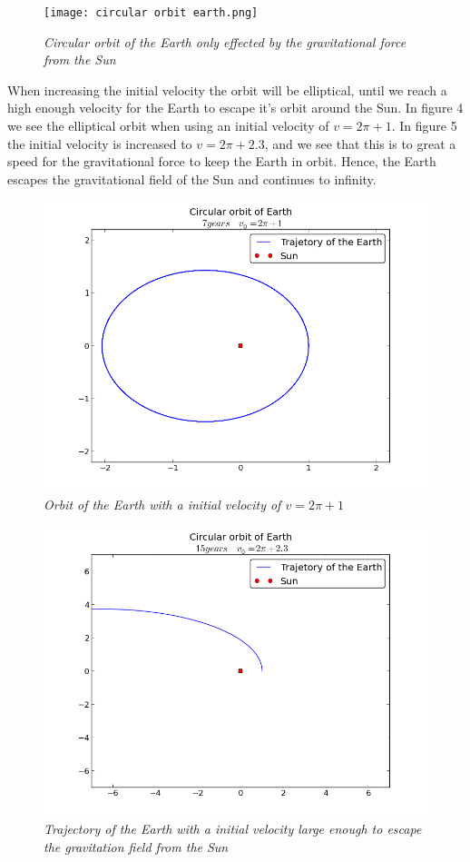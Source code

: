 \documentclass[a4paper,12pt, english]{article}
\begin{document}
\begin{figure}[h!]
  \centering
    \texttt{[image: circular orbit earth.png]}
  \caption{\textit{Circular orbit of the Earth only effected by the gravitational force from the Sun}}
\end{figure}


When increasing the initial velocity the orbit will be elliptical, until we reach a high enough velocity for the Earth to escape it's orbit around the Sun. In figure 4 we see the elliptical orbit when using an initial velocity of $v = 2 \pi +1$. In figure 5 the initial velocity is increased to $v = 2 \pi + 2.3$, and we see that this is to great a speed for the gravitational force to keep the Earth in orbit. Hence, the Earth escapes the gravitational field of the Sun and continues to infinity.  

\begin{figure}[h!]
  \centering
    	\includegraphics[scale=0.5]{circular_orbit_1.png}
  \caption{\textit{Orbit of the Earth with a initial velocity of $v = 2 \pi +1$}}
\end{figure}

\begin{figure}[h!]
  \centering
    \includegraphics[scale=0.5]{circular_orbit_2.png}
  \caption{\textit{Trajectory of the Earth with a initial velocity large enough to escape the gravitation field from the Sun}}
\end{figure}
\end{document}
